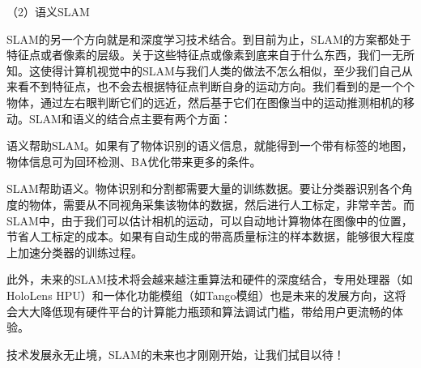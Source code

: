 （2）语义SLAM

SLAM的另一个方向就是和深度学习技术结合。到目前为止，SLAM的方案都处于特征点或者像素的层级。关于这些特征点或像素到底来自于什么东西，我们一无所知。这使得计算机视觉中的SLAM与我们人类的做法不怎么相似，至少我们自己从来看不到特征点，也不会去根据特征点判断自身的运动方向。我们看到的是一个个物体，通过左右眼判断它们的远近，然后基于它们在图像当中的运动推测相机的移动。SLAM和语义的结合点主要有两个方面：

语义帮助SLAM。如果有了物体识别的语义信息，就能得到一个带有标签的地图，物体信息可为回环检测、BA优化带来更多的条件。

SLAM帮助语义。物体识别和分割都需要大量的训练数据。要让分类器识别各个角度的物体，需要从不同视角采集该物体的数据，然后进行人工标定，非常辛苦。而SLAM中，由于我们可以估计相机的运动，可以自动地计算物体在图像中的位置，节省人工标定的成本。如果有自动生成的带高质量标注的样本数据，能够很大程度上加速分类器的训练过程。

此外，未来的SLAM技术将会越来越注重算法和硬件的深度结合，专用处理器（如HoloLens HPU）和一体化功能模组（如Tango模组）也是未来的发展方向，这将会大大降低现有硬件平台的计算能力瓶颈和算法调试门槛，带给用户更流畅的体验。

技术发展永无止境，SLAM的未来也才刚刚开始，让我们拭目以待！



